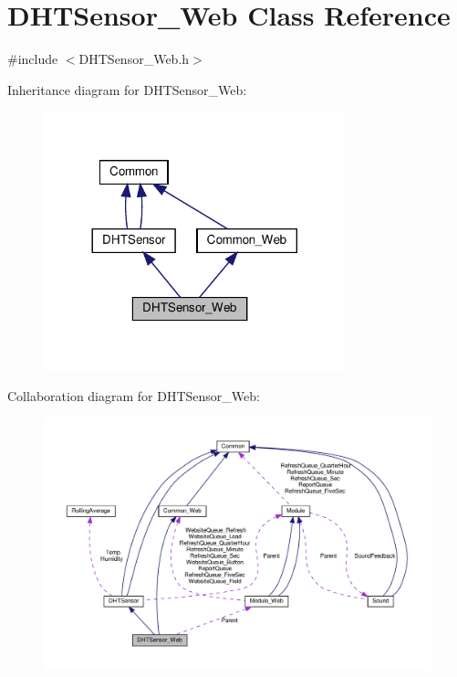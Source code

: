 \hypertarget{class_d_h_t_sensor___web}{}\section{D\+H\+T\+Sensor\+\_\+\+Web Class Reference}
\label{class_d_h_t_sensor___web}


{\ttfamily \#include $<$D\+H\+T\+Sensor\+\_\+\+Web.\+h$>$}



Inheritance diagram for D\+H\+T\+Sensor\+\_\+\+Web\+:
\nopagebreak
\begin{figure}[H]
\begin{center}
\leavevmode
\includegraphics[width=248pt]{class_d_h_t_sensor___web__inherit__graph}
\end{center}
\end{figure}


Collaboration diagram for D\+H\+T\+Sensor\+\_\+\+Web\+:
\nopagebreak
\begin{figure}[H]
\begin{center}
\leavevmode
\includegraphics[width=350pt]{class_d_h_t_sensor___web__coll__graph}
\end{center}
\end{figure}
